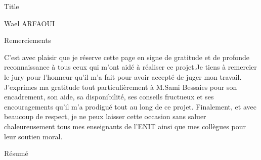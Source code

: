 \documentclass[11pt,fleqn]{book} %
\begin{document}
	
	\begingroup
	\thispagestyle{empty}
	
	\centering
	\vspace*{9cm}
	\par\normalfont\fontsize{35}{35}\sffamily\selectfont
	Title\par %
	\vspace*{1cm}
	{\Huge Wael ARFAOUI}\par %
	\endgroup
	
	\frontmatter
	
	\begin{center}
		\vspace*{5cm}
		\par\normalfont\fontsize{20}{20}\sffamily\selectfont
		Remerciements
		\par\normalfont\fontsize{14}{14}\sffamily\selectfont
		\vspace*{1cm}
		C’est avec plaisir que je réserve cette page en signe de gratitude et de
		profonde reconnaissance à tous ceux qui m'ont aidé à réaliser ce projet.Je
		tiens à remercier le jury pour l’honneur qu’il m'a fait pour avoir accepté
		de juger mon travail.
		J'exprimes ma gratitude tout particulièrement à M.Sami Bessaies pour son encadrement, son aide, sa disponibilité, ses conseils fructueux et ses encouragements qu’il m'a prodigué tout au long de ce projet.
		Finalement, et avec beaucoup de respect, je ne peux laisser cette occasion
		sans saluer chaleureusement tous mes enseignants de l’ENIT ainsi que
		mes collègues pour leur soutien moral.\par
	\end{center}
	
	\newpage
	\begin{center}
		\vspace*{5cm}
		\normalfont
		{\LARGE Résumé}
		\vspace*{1cm}
	\end{center}
	\normalfont
\end{document}
